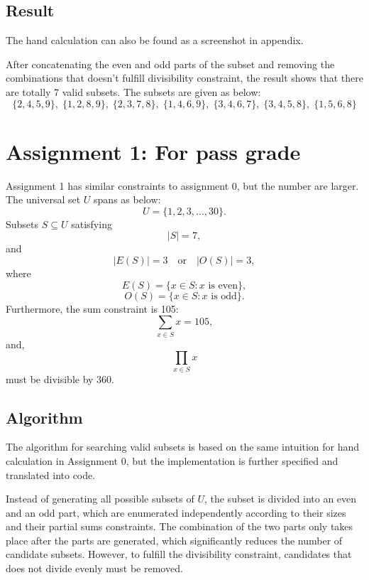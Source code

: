 \documentclass[11pt,a4paper]{article}
\begin{document}
\subsection*{Result}

The hand calculation can also be found as a screenshot in appendix.

After concatenating the even and odd parts of the subset and removing the combinations that doesn't fulfill divisibility constraint, the result shows that there are totally 7 valid subsets. The subsets are given as below:
\[
\{2, 4, 5, 9\},\;
\{1, 2, 8, 9\},\;
\{2, 3, 7, 8\},\;
\{1, 4, 6, 9\},\;
\{3, 4, 6, 7\},\;
\{3, 4, 5, 8\},\;
\{1, 5, 6, 8\}
\]



\section*{Assignment 1: For pass grade}

Assignment 1 has similar constraints to assignment 0, but the number are larger. The universal set $U$ spans as below:
\[
U = \{1,2,3,\ldots,30\}.
\]
Subsets $S\subseteq U$ satisfying
\[
|S|=7,
\]
and
\[
|E(S)|=3
\quad\text{or}\quad
|O(S)|=3,
\]
where
\[
E(S)=\{x\in S:x\text{ is even}\},
\]
\[
O(S)=\{x\in S:x\text{ is odd}\}.
\]
Furthermore, the sum constraint is 105:
\[
\sum_{x\in S}x=105,
\]
and,
\[
\prod_{x\in S}x
\]
must be divisible by $360$.


\subsection*{Algorithm}


The algorithm for searching valid subsets is based on the same intuition for hand calculation in Assignment 0, but the implementation is further specified and translated into code.

Instead of generating all possible subsets of $U$, the subset is divided into an even and an odd part, which are enumerated independently according to their sizes and their partial sums constraints. The combination of the two parts only takes place after the parts are generated, which significantly reduces the number of candidate subsets. However, to fulfill the divisibility constraint, candidates that does not divide evenly must be removed.
\end{document}

